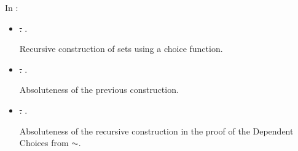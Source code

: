 In 
:
\begin{itemize}
\item
  \sout{.}
  .

  Recursive construction of sets using a choice function.
\item
  \sout{.}
  .
  
  Absoluteness of the previous construction.
\end{itemize}
%
\begin{itemize}
\item
  \sout{.}
  .
  
  Absoluteness of the recursive construction in the proof of the
  Dependent Choices from $\AC$.
\end{itemize}

